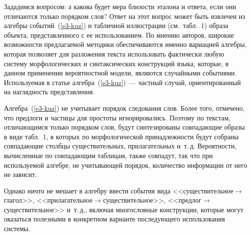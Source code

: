 \begin{multicols}{2}
      Зададимся вопросом: а какова будет мера близости эталона и ответа, если 
они отличаются только порядком слов? Ответ на этот вопрос может быть извлечен 
из алгебры событий~(\ref{e3-kuz}) и табличной иллюстрации (см.\ табл.~1) образа 
объекта, представленного с ее использованием. По мнению авторов, широкие 
возможности предлагаемой методики обеспечиваются именно вариацией алгебры, 
которая позволяет для разложения текста использовать фактически любую систему 
морфологических и синтаксических конструкций языка, которые, в данном 
применении вероятностной модели, являются случайными событиями. 
Используемая в статье алгебра~(\ref{e3-kuz})~--- частный случай, ориентированный 
на наглядность представления. 
      
      Алгебра~(\ref{e3-kuz}) не учитывает порядок следования слов. Более того, 
отмечено, что предлоги и частицы для простоты игнорировались. Поэтому по 
текстам, отличающимся только порядком слов, будут синтезированы совпадающие 
образы в виде табл.~1, в которых по морфологической принадлежности будут 
собраны совпадающие столбцы существительных, прилагательных и~т.\,д. 
Вероятности, вычисленные по совпадающим таблицам, также совпадут, так что при 
используемой алгебре, не учитывающей порядок, количество информации от него 
не зависит. 
      
      Однако ничто не мешает в алгебру ввес\-ти со\-бытия вида 
<<существительное\;$\rightarrow$\;глагол>>, 
<<при\-лагатель\-ное\;$\rightarrow$\;су\-щест\-ви\-тель\-ное>>, 
<<пред\-лог\;$\rightarrow$\;су\-щест\-ви\-тель\-ное>> и~т.\,д., включая многословные\linebreak 
конструкции, которые могут оказаться полезными в конкретном варианте 
последующего использования системы. 

\begin{table*}[b]\small
\vspace*{-3pt}
\begin{center}
\vspace*{2ex}



\end{center}
\end{table*}
\end{multicols}
